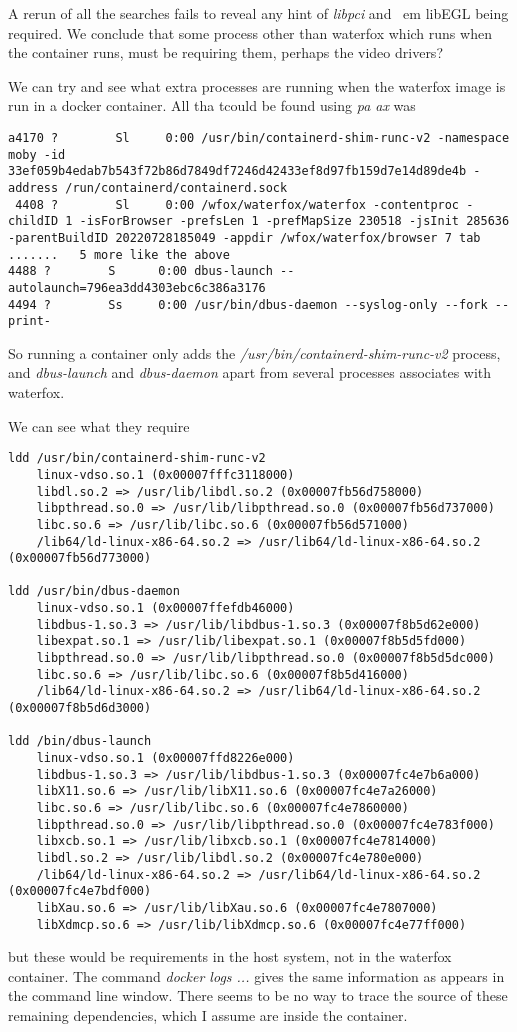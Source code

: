 \documentclass{article}  %
\begin{document}
A rerun of all the searches fails to reveal any hint of {\em libpci} and {\
em libEGL} being required. We conclude that some process other than waterfox which runs when the container runs, must be requiring them, perhaps the video drivers?

We can try and see what extra processes are running when the waterfox image is run in a docker container. All tha tcould be found using {\em pa ax} was
\begin{verbatim}
a4170 ?        Sl     0:00 /usr/bin/containerd-shim-runc-v2 -namespace moby -id 33ef059b4edab7b543f72b86d7849df7246d42433ef8d97fb159d7e14d89de4b -address /run/containerd/containerd.sock
 4408 ?        Sl     0:00 /wfox/waterfox/waterfox -contentproc -childID 1 -isForBrowser -prefsLen 1 -prefMapSize 230518 -jsInit 285636 -parentBuildID 20220728185049 -appdir /wfox/waterfox/browser 7 tab
.......   5 more like the above
4488 ?        S      0:00 dbus-launch --autolaunch=796ea3dd4303ebc6c386a3176
4494 ?        Ss     0:00 /usr/bin/dbus-daemon --syslog-only --fork --print-
\end{verbatim}
 So running a container only adds the {\em /usr/bin/containerd-shim-runc-v2} process, and {\em dbus-launch} and {\em dbus-daemon} apart from several processes associates with waterfox.

We can see what they require
\begin{verbatim}
ldd /usr/bin/containerd-shim-runc-v2
	linux-vdso.so.1 (0x00007fffc3118000)
	libdl.so.2 => /usr/lib/libdl.so.2 (0x00007fb56d758000)
	libpthread.so.0 => /usr/lib/libpthread.so.0 (0x00007fb56d737000)
	libc.so.6 => /usr/lib/libc.so.6 (0x00007fb56d571000)
	/lib64/ld-linux-x86-64.so.2 => /usr/lib64/ld-linux-x86-64.so.2 (0x00007fb56d773000)

ldd /usr/bin/dbus-daemon
	linux-vdso.so.1 (0x00007ffefdb46000)
	libdbus-1.so.3 => /usr/lib/libdbus-1.so.3 (0x00007f8b5d62e000)
	libexpat.so.1 => /usr/lib/libexpat.so.1 (0x00007f8b5d5fd000)
	libpthread.so.0 => /usr/lib/libpthread.so.0 (0x00007f8b5d5dc000)
	libc.so.6 => /usr/lib/libc.so.6 (0x00007f8b5d416000)
	/lib64/ld-linux-x86-64.so.2 => /usr/lib64/ld-linux-x86-64.so.2 (0x00007f8b5d6d3000)

ldd /bin/dbus-launch
	linux-vdso.so.1 (0x00007ffd8226e000)
	libdbus-1.so.3 => /usr/lib/libdbus-1.so.3 (0x00007fc4e7b6a000)
	libX11.so.6 => /usr/lib/libX11.so.6 (0x00007fc4e7a26000)
	libc.so.6 => /usr/lib/libc.so.6 (0x00007fc4e7860000)
	libpthread.so.0 => /usr/lib/libpthread.so.0 (0x00007fc4e783f000)
	libxcb.so.1 => /usr/lib/libxcb.so.1 (0x00007fc4e7814000)
	libdl.so.2 => /usr/lib/libdl.so.2 (0x00007fc4e780e000)
	/lib64/ld-linux-x86-64.so.2 => /usr/lib64/ld-linux-x86-64.so.2 (0x00007fc4e7bdf000)
	libXau.so.6 => /usr/lib/libXau.so.6 (0x00007fc4e7807000)
	libXdmcp.so.6 => /usr/lib/libXdmcp.so.6 (0x00007fc4e77ff000)

\end{verbatim}
but these would be requirements in the host system, not in the waterfox container.
The command {\em docker logs ...} gives the same information as appears in the command line window.  There seems to be no way  to trace the source of these remaining dependencies, which I assume are inside the container.
\end{document}

